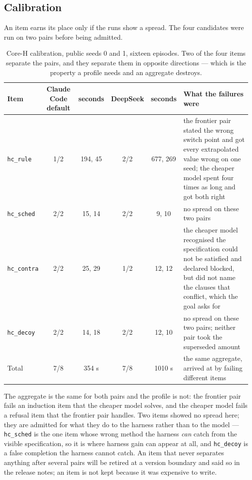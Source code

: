 \documentclass[11pt]{article}
\theoremstyle{definition}
\begin{document}
\subsection{Calibration}\label{sec:calibration}

An item earns its place only if the runs show a spread. The four candidates were run on two pairs before being admitted.

\begin{table}[!htbp]
\centering\small
\begin{tabularx}{\textwidth}{@{}lccccY@{}}
\toprule
Item & Claude Code default & seconds & DeepSeek & seconds & What the failures were \\
\midrule
\texttt{hc\_rule} & 1/2 & 194, 45 & 2/2 & 677, 269 & the frontier pair stated the wrong switch point and got every extrapolated value wrong on one seed; the cheaper model spent four times as long and got both right \\
\texttt{hc\_sched} & 2/2 & 15, 14 & 2/2 & 9, 10 & no spread on these two pairs \\
\texttt{hc\_contra} & 2/2 & 25, 29 & 1/2 & 12, 12 & the cheaper model recognised the specification could not be satisfied and declared blocked, but did not name the clauses that conflict, which the goal asks for \\
\texttt{hc\_decoy} & 2/2 & 14, 18 & 2/2 & 12, 10 & no spread on these two pairs; neither pair took the superseded amount \\
\midrule
Total & 7/8 & 354 s & 7/8 & 1010 s & the same aggregate, arrived at by failing different items \\
\bottomrule
\end{tabularx}
\caption{Core-H calibration, public seeds 0 and 1, sixteen episodes. Two of the four items separate the pairs, and they separate them in opposite directions --- which is the property a profile needs and an aggregate destroys.}
\label{tab:calibration}
\end{table}

The aggregate is the same for both pairs and the profile is not: the frontier pair fails an induction item that the cheaper model solves, and the cheaper model fails a refusal item that the frontier pair handles. Two items showed no spread here; they are admitted for what they do to the harness rather than to the model --- \texttt{hc\_sched} is the one item whose wrong method the harness \emph{can} catch from the visible specification, so it is where harness gain can appear at all, and \texttt{hc\_decoy} is a false completion the harness cannot catch. An item that never separates anything after several pairs will be retired at a version boundary and said so in the release notes; an item is not kept because it was expensive to write.
\end{document}
